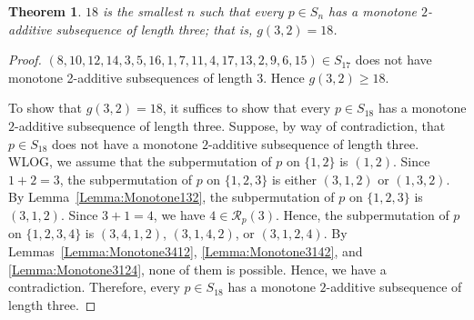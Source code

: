 \documentclass[10pt,a4paper]{amsart}
\newtheorem{theorem}{Theorem}[section]
\begin{document}
\begin{theorem}\label{Theorem:Monotone2Additive}
    $18$ is the smallest $n$ such that every $p\in S_n$ has a monotone $2$-additive subsequence of length three; that is, $g(3,2)=18$.
\end{theorem}
\begin{proof}
$(8,10,12,14,3,5,16,1,7,11,4,17,13,2,9,6,15)\in S_{17}$ does not have monotone 2-additive subsequences of length 3. Hence $g(3,2)\geq18$.

To show that $g(3,2)=18$, it suffices to show that every $p\in S_{18}$ has a monotone $2$-additive subsequence of length three. Suppose, by way of contradiction, that $p\in S_{18}$ does not have a monotone $2$-additive subsequence of length three. WLOG, we assume that the subpermutation of $p$ on $\{1,2\}$ is $(1,2)$. Since $1+2=3$, the subpermutation of $p$ on $\{1,2,3\}$ is either $(3,1,2)$ or $(1,3,2)$. By Lemma~\ref{Lemma:Monotone132}, the subpermutation of $p$ on $\{1,2,3\}$ is $(3,1,2)$. Since $3+1=4$, we have $4\in\mathcal{R}_p(3)$. Hence, the subpermutation of $p$ on $\{1,2,3,4\}$ is $(3,4,1,2)$, $(3,1,4,2)$, or $(3,1,2,4)$. By Lemmas~\ref{Lemma:Monotone3412}, \ref{Lemma:Monotone3142}, and  \ref{Lemma:Monotone3124}, none of them is possible. Hence, we have a contradiction. Therefore, every $p\in S_{18}$ has a monotone $2$-additive subsequence of length three.
\end{proof}
\end{document}
